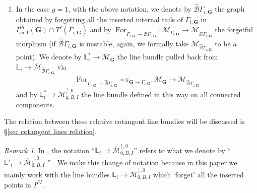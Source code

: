 \documentclass[11pt]{amsart}
\theoremstyle{definition}
\theoremstyle{remark}
\newtheorem{rmk}[dummy]{Remark}
\newcommand{\<}{\left<}
\renewcommand{\>}{\right>}
\numberwithin{equation}{section}
\def\Mbar{{\overline{\mathcal M}}}
\begin{document}
\begin{enumerate}
    \item 
    In the case $g=1$, with the above notation, we denote by $\hat{\mathcal B} \Gamma_{i,\bm{G}}$ the graph obtained by forgetting all the inserted internal tails of $\Gamma_{i,\bm{G}}$ in $I^{PI}_{sp,1}(\bm{G})\cap T^I(\Gamma_{i,\bm{G}})$ and by $\operatorname{For}_{\Gamma_{i,\bm{G}}\to \hat{\mathcal B} \Gamma_{i,\bm{G}}}\colon \Mbar_{\Gamma_{i,\bm{G}}}\to \Mbar_{\hat{\mathcal B} \Gamma_{i,\bm{G}}}$ the forgetful morphism (if $\hat{\mathcal B} \Gamma_{i,\bm{G}}$ is %
unstable, again, we %
formally take $\Mbar_{\hat{\mathcal B} \Gamma_{i,\bm{G}}}$ to be a point). We denote by $\mathbb L^*_i\to \Mbar_{\bm{G}}$ the line bundle pulled back from $\mathbb L_i\to \Mbar_{\hat{\mathcal B} \Gamma_{i,\bm{G}}}$ via 
    $$\operatorname{For}_{\Gamma_{i,\bm{G}}\to \hat{\mathcal B} \Gamma_{i,\bm{G}}}\circ \pi_{\bm{G}\to \Gamma_{i,\bm{G}}} \colon \Mbar_{\bm{G}} \to \Mbar_{\hat{\mathcal B} \Gamma_{i,\bm{G}}}$$ 
    and by $\mathbb L^*_i\to \Mbar^{\frac{1}{r},0}_{g,B,I}$ the line bundle defined in this way on all connected components.
    
    \end{enumerate}

 The relation between these relative cotangent line bundles will be discussed is \S \ref{sec cotangent lines relation}.

\begin{rmk}\label{rmk different notation for L in TZ}
    In \cite{TZ1,TZ2}, the notation ``$\mathbb L_i\to \Mbar^{\frac{1}{r},0}_{0,B,I}$'' refers to what we denote by ``$\mathbb L'_i\to \Mbar^{\frac{1}{r},0}_{0,B,I}$ %
'' . We %
make this change of notation because in this paper we mainly work with the line bundles $\mathbb L_i\to \Mbar^{\frac{1}{r},0}_{0,B,I}$ %
which `forget' all %
the inserted points in $I^{PI}$. 
\end{rmk}
\end{document}
